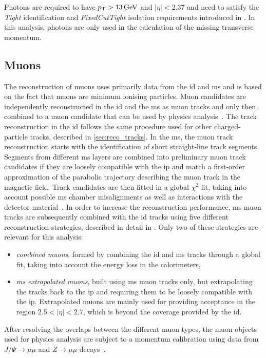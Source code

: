 Photons are required to have $p_{\textrm{T}} > \SI{13}{GeV}$ and $\vert\eta\vert<2.37$ and need to satisfy the \textit{Tight} identification and \textit{FixedCutTight} isolation requirements introduced in \cite{EGAM-2018-01}. In this analysis, photons are only used in the calculation of the missing transverse momentum.

\subsection{Muons}

The reconstruction of muons uses primarily data from the \gls{id} and \gls{ms} and is based on the fact that muons are minimum ionising particles. Muon candidates are independently reconstructed in the \gls{id} and the \gls{ms} as muon tracks and only then combined  to a muon candidate that can be used by physics analysis~\cite{PERF-2015-10,Aad:2020gmm}. The track reconstruction in the \gls{id} follows the same procedure used for other charged-particle tracks, described in \cref{sec:reco_tracks}. In the \gls{ms}, the muon track reconstruction starts with the identification of short straight-line track segments. Segments from different \gls{ms} layers are combined into preliminary muon track candidates if they are loosely compatible with the \gls{ip} and match a first-order approximation of the parabolic trajectory describing the muon track in the magnetic field. Track candidates are then fitted in a global $\chi^2$ fit, taking into account possible \gls{ms} chamber misalignments as well as interactions with the detector material~\cite{Aad:2020gmm}. In order to increase the reconstruction performance, \gls{ms} muon tracks are subsequently combined with the \gls{id} tracks using five different reconstruction strategies, described in detail in \cite{Aad:2020gmm}. Only two of these strategies are relevant for this analysis:
\begin{itemize}
	\item \textit{combined muons}, formed by combining the \gls{id} and \gls{ms} tracks through a global fit, taking into account the energy loss in the calorimeters,
	\item \textit{\gls{ms} extrapolated muons}, built using \gls{ms} muon tracks only, but extrapolating the tracks back to the \gls{ip} and requiring them to be loosely compatible with the \gls{ip}. Extrapolated muons are mainly used for providing acceptance in the region $2.5 < \vert\eta\vert < 2.7$, which is beyond the coverage provided by the \gls{id}.
\end{itemize}
After resolving the overlaps between the different muon types, the muon objects used for physics analysis are subject to a momentum calibration using data from $J/\Psi\rightarrow\mu\mu$ and $Z\rightarrow\mu\mu$ decays~\cite{PERF-2015-10,Aad:2020gmm}.

